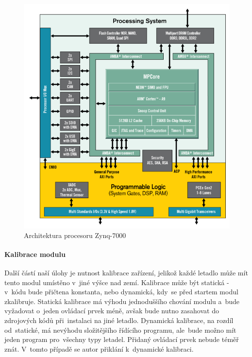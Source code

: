 				\begin{figure}[H]
					\begin{center}
						\includegraphics[scale=0.6]{obrazky-figures/zynq-mp-core-single.png}
						\caption{Architektura procesoru Zynq-7000\protect\footnotemark}
						\label{teorie::embedded::zynq}
					\end{center}
				\end{figure}
			

			
			
			\paragraph{Kalibrace modulu}
				Další částí naší úlohy je nutnost kalibrace zařízení, jelikož každé letadlo může mít tento modul umístěno v~jiné výšce nad zemí. Kalibrace může být statická - v~kódu bude přičtena konstanta, nebo dynamická, kdy~se před startem modul zkalibruje. Statická kalibrace má výhodu jednoduššího chování modulu a~bude vyžadovat o~jeden ovládací prvek méně, avšak bude nutno zasahovat do zdrojových kódů při~instalaci na jiné letadlo. Dynamická kalibrace, na rozdíl od~statické, má nevýhodu složitějšího řídícího programu, ale~bude možno mít jeden program pro~všechny typy letadel. Přidaný ovládací prvek nebude téměř znát. V~tomto případě se autor přiklání k~dynamické kalibraci.
				
